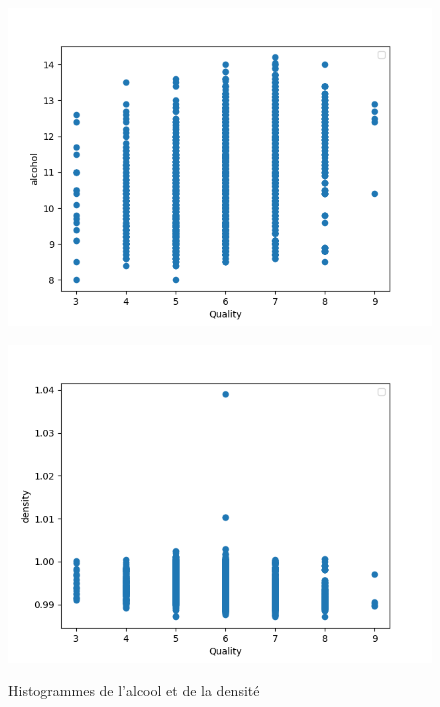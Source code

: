 \begin{figure}[!htb]
    \begin{minipage}{0.5\textwidth}
        \centering
        \includegraphics[width=01\textwidth]{../images/histo/alcohol.png}
        \label{fig:histogramme de l'alcool}
    \end{minipage}\hfill
    \begin{minipage}{0.5\textwidth}
        \centering
        \includegraphics[width=01\textwidth]{../images/histo/density.png}
        \label{fig:histogramme de la densité}
    \end{minipage}
    \caption{Histogrammes de l'alcool et de la densité}
\end{figure}

